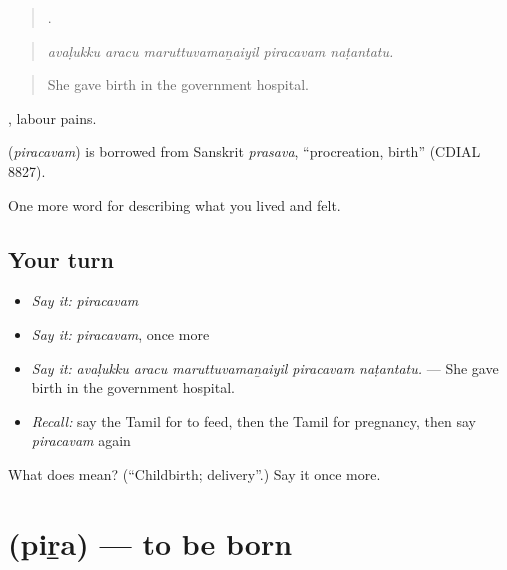 \begin{quote}
    .
\end{quote}

\begin{quote}
\emph{avaḷukku aracu maruttuvamaṉaiyil piracavam naṭantatu.}
\end{quote}

\begin{quote}
She gave birth in the government hospital.
\end{quote}

 , labour pains.

\begin{cousinweb}
\textbf{} (\emph{piracavam}) is borrowed from Sanskrit \emph{prasava}, \textquotedblleft{}procreation, birth\textquotedblright{} (CDIAL 8827).
\end{cousinweb}

\begin{grammarlens}[title={What you've built}]
One more word for describing what you lived and felt.
\end{grammarlens}

\subsection*{Your turn}
\begin{itemize}
\raggedright
  \item \emph{Say it:} \emph{piracavam}
  \item \emph{Say it:} \emph{piracavam}, once more
  \item \emph{Say it:} \emph{avaḷukku aracu maruttuvamaṉaiyil piracavam naṭantatu.} — She gave birth in the government hospital.
  \item \emph{Recall:} say the Tamil for to feed, then the Tamil for pregnancy, then say \emph{piracavam} again
\end{itemize}

\begin{tcolorbox}[breakable,colback=teal!4,colframe=teal!35!black,title={Before you move on}]
What does  mean? (\textquotedblleft{}Childbirth; delivery\textquotedblright{}.) Say it once more.
\end{tcolorbox}
\section[\texorpdfstring{\ta{பிற} (piṟa)}{பிற (piṟa)}]{ (piṟa) — to be born}

